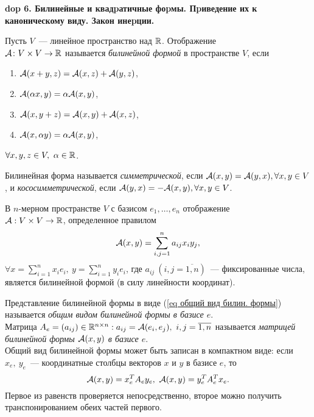 \textbf{\LARGE dop 6. Билинейные и квадpатичные фоpмы. Пpиведение их к каноническому виду. Закон инеpции.}


\begin{definition}
Пусть $V$~--- линейное пространство над ${\mathbb{R}}$. Отображение\\ ${\mathcal{A}}\colon V\times V\to {\mathbb{R}}$ называется \emph{билинейной формой} в пространстве $V$, если
\begin{enumerate}
    \item ${\mathcal{A}}(x+y,z)={\mathcal{A}}(x,z)+{\mathcal{A}}(y,z)$,
    \item ${\mathcal{A}}(\alpha x,y)=\alpha{\mathcal{A}}(x,y)$,
    \item ${\mathcal{A}}(x,y+z)={\mathcal{A}}(x,y)+{\mathcal{A}}(x,z)$,
    \item ${\mathcal{A}}(x,\alpha y)=\alpha{\mathcal{A}}(x,y)$,
\end{enumerate}
$\forall x,y,z\in V,~\alpha\in{\mathbb{R}}$.
\end{definition}

\begin{definition}
Билинейная форма называется \emph{симметрической}, если ${\mathcal{A}}(x,y)={\mathcal{A}}(y,x),\forall x,y\in V$, и \emph{кососимметрической}, если ${\mathcal{A}}(y,x)=-{\mathcal{A}}(x,y),\forall x,y\in V$.
\end{definition}

\begin{example}
В $n$-мерном пространстве $V$ с базисом $e_1,\ldots,e_n$ отображение\\ ${\mathcal{A}}:V\times V\to{\mathbb{R}}$, определенное правилом
\begin{equation}
\label{eq общий вид билин. формы}
    {\mathcal{A}}(x,y)=\sum_{i,j=1}^na_{ij}x_iy_j,
\end{equation}
$\forall x=\sum_{i=1}^nx_ie_i,~y=\sum_{i=1}^ny_ie_i$, где $a_{ij}~(i,j=\overline{1,n})$~--- фиксированные числа, является билинейной формой (в силу линейности координат).
\end{example}

\begin{definition}
Представление билинейной формы в виде (\ref{eq общий вид билин. формы}) называется \emph{общим видом билинейной формы в базисе $e$}.\\
Матрица $A_e=(a_{ij})\in{\mathbb{R}}^{n\times n}:a_{ij}={\mathcal{A}}(e_i,e_j),~i,j=\overline{1,n}$ называется \emph{матрицей билинейной формы ${\mathcal{A}}(x,y)$ в базисе $e$}.\\
Общий вид билинейной формы может быть записан в компактном виде: если $x_e,~y_e$~--- координатные столбцы векторов $x$ и $y$ в базисе $e$, то
\begin{equation}
\label{eq комп. вид билин. формы}
    {\mathcal{A}}(x,y)=x_e^TA_ey_e,~{\mathcal{A}}(x,y)=y_e^TA_e^Tx_e.
\end{equation}
Первое из равенств проверяется непосредственно, второе можно получить транспонированием обеих частей первого.
\end{definition}

